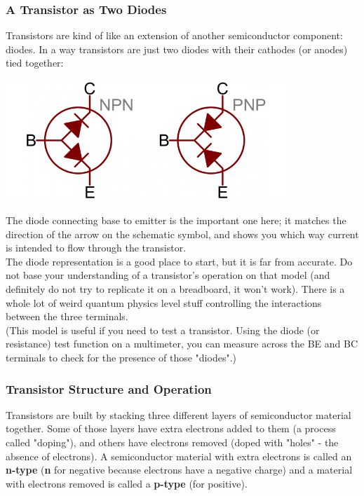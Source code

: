 \documentclass[a4paper, 11pt]{article} %
\begin{document}
\subsubsection*{A Transistor as Two Diodes}

Transistors are kind of like an extension of another semiconductor component: diodes. In a way transistors are just two diodes with their cathodes (or anodes) tied together:

\begin{center}
\includegraphics[width=300pt]{tran3}
\end{center}

The diode connecting base to emitter is the important one here; it matches the direction of the arrow on the schematic symbol, and shows you which way current is intended to flow through the transistor.\\

The diode representation is a good place to start, but it is far from accurate. Do not base your understanding of a transistor's operation on that model (and definitely do not try to replicate it on a breadboard, it won't work). There is a whole lot of weird quantum physics level stuff controlling the interactions between the three terminals.\\

(This model is useful if you need to test a transistor. Using the diode (or resistance) test function on a multimeter, you can measure across the BE and BC terminals to check for the presence of those "diodes".)

\subsubsection*{Transistor Structure and Operation}

Transistors are built by stacking three different layers of semiconductor material together. Some of those layers have extra electrons added to them (a process called "doping"), and others have electrons removed (doped with "holes" - the absence of electrons). A semiconductor material with extra electrons is called an \textbf{n-type} (\textbf{n} for negative because electrons have a negative charge) and a material with electrons removed is called a \textbf{p-type} (for positive).
\end{document}

